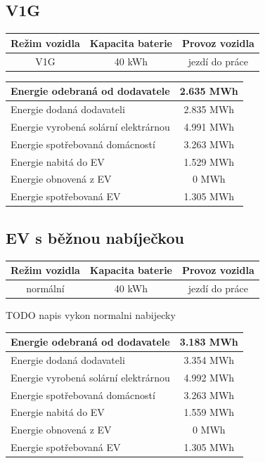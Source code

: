 \documentclass[12pt,a4paper]{Cotmas-2018}
\begin{document}
\subsection{V1G}

\bigskip
\begin{tabular}{ | c | c | c | }
\hline
Režim vozidla & Kapacita baterie & Provoz vozidla \\
\hline
V1G & 40 kWh & jezdí do práce \\
\hline
\end{tabular}
\bigskip

\bigskip
\begin{tabular}{ | l | c | }
\hline
Energie odebraná od dodavatele & 2.635 MWh \\
\hline
Energie dodaná dodavateli & 2.835 MWh \\
\hline
Energie vyrobená solární elektrárnou & 4.991 MWh \\
\hline
Energie spotřebovaná domácností & 3.263 MWh \\
\hline
Energie nabitá do EV & 1.529 MWh \\
\hline
Energie obnovená z EV & 0 MWh \\
\hline
Energie spotřebovaná EV & 1.305 MWh \\
\hline
\end{tabular}
\bigskip


\subsection{EV s běžnou nabíječkou}

\bigskip
\begin{tabular}{ | c | c | c | }
\hline
Režim vozidla & Kapacita baterie & Provoz vozidla \\
\hline
normální & 40 kWh & jezdí do práce \\
\hline
\end{tabular}
\bigskip

TODO napis vykon normalni nabijecky

\bigskip
\begin{tabular}{ | l | c | }
\hline
Energie odebraná od dodavatele & 3.183 MWh \\
\hline
Energie dodaná dodavateli & 3.354 MWh \\
\hline
Energie vyrobená solární elektrárnou & 4.992 MWh \\
\hline
Energie spotřebovaná domácností & 3.263 MWh \\
\hline
Energie nabitá do EV & 1.559 MWh \\
\hline
Energie obnovená z EV & 0 MWh \\
\hline
Energie spotřebovaná EV & 1.305 MWh \\
\hline
\end{tabular}
\bigskip
\end{document}
